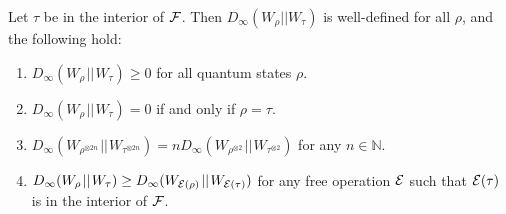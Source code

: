 \documentclass[
twocolumn,
superscriptaddress
]{revtex4-1}
\newenvironment{customthm}[1]
  {\renewcommand\theinnercustomthm{#1}\innercustomthm}
  {\endinnercustomthm}
\def\E{{\cal E}}
\def\F{{\cal F}}
\begin{document}
\begin{customthm}{8}
	Let $\tau$ be in the interior of $\F$. Then $D_\infty(W_\rho || W_\tau)$ is well-defined for all $\rho$, and the following hold:
\begin{enumerate}
\item $D_\infty(W_\rho \hspace{1pt}||\hspace{1pt} W_\tau) \ge 0$ for all quantum states $\rho$.
\item  $D_\infty(W_\rho \hspace{1pt}||\hspace{1pt} W_\tau) = 0$ if and only if $\rho =\tau$.
\item $D_\infty(W_{\rho^{\otimes 2n}} \hspace{1pt}||\hspace{1pt} W_{\tau^{\otimes 2n}}) = n D_\infty(W_{\rho^{\otimes 2}} \hspace{1pt}||\hspace{1pt} W_{\tau^{\otimes 2}})$ for any $n \in \mathbb{N}$.
\item $D_\infty(W_\rho \hspace{1pt}||\hspace{1pt} W_\tau) \geq D_\infty(W_{\E(\rho)} \hspace{1pt}||\hspace{1pt} W_{\E(\tau)})$ for any free operation $\E$ such that $\E(\tau)$ is in the interior of $\F$.
\end{enumerate}
\end{customthm}
\end{document}
